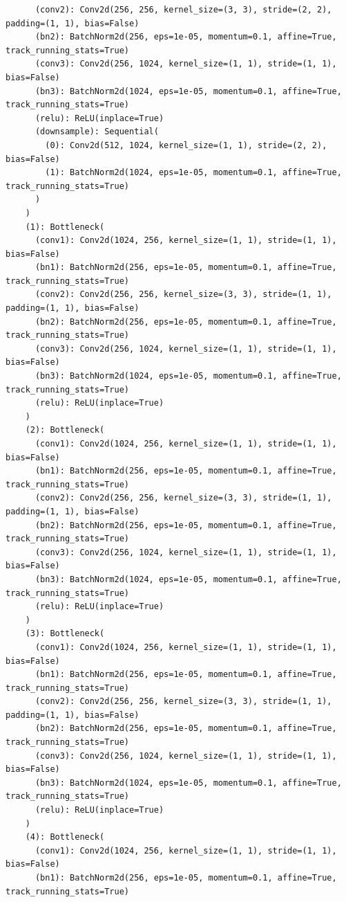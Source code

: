 \documentclass{article}
\begin{document}
\begin{verbatim}
      (conv2): Conv2d(256, 256, kernel_size=(3, 3), stride=(2, 2), padding=(1, 1), bias=False)
      (bn2): BatchNorm2d(256, eps=1e-05, momentum=0.1, affine=True, track_running_stats=True)
      (conv3): Conv2d(256, 1024, kernel_size=(1, 1), stride=(1, 1), bias=False)
      (bn3): BatchNorm2d(1024, eps=1e-05, momentum=0.1, affine=True, track_running_stats=True)
      (relu): ReLU(inplace=True)
      (downsample): Sequential(
        (0): Conv2d(512, 1024, kernel_size=(1, 1), stride=(2, 2), bias=False)
        (1): BatchNorm2d(1024, eps=1e-05, momentum=0.1, affine=True, track_running_stats=True)
      )
    )
    (1): Bottleneck(
      (conv1): Conv2d(1024, 256, kernel_size=(1, 1), stride=(1, 1), bias=False)
      (bn1): BatchNorm2d(256, eps=1e-05, momentum=0.1, affine=True, track_running_stats=True)
      (conv2): Conv2d(256, 256, kernel_size=(3, 3), stride=(1, 1), padding=(1, 1), bias=False)
      (bn2): BatchNorm2d(256, eps=1e-05, momentum=0.1, affine=True, track_running_stats=True)
      (conv3): Conv2d(256, 1024, kernel_size=(1, 1), stride=(1, 1), bias=False)
      (bn3): BatchNorm2d(1024, eps=1e-05, momentum=0.1, affine=True, track_running_stats=True)
      (relu): ReLU(inplace=True)
    )
    (2): Bottleneck(
      (conv1): Conv2d(1024, 256, kernel_size=(1, 1), stride=(1, 1), bias=False)
      (bn1): BatchNorm2d(256, eps=1e-05, momentum=0.1, affine=True, track_running_stats=True)
      (conv2): Conv2d(256, 256, kernel_size=(3, 3), stride=(1, 1), padding=(1, 1), bias=False)
      (bn2): BatchNorm2d(256, eps=1e-05, momentum=0.1, affine=True, track_running_stats=True)
      (conv3): Conv2d(256, 1024, kernel_size=(1, 1), stride=(1, 1), bias=False)
      (bn3): BatchNorm2d(1024, eps=1e-05, momentum=0.1, affine=True, track_running_stats=True)
      (relu): ReLU(inplace=True)
    )
    (3): Bottleneck(
      (conv1): Conv2d(1024, 256, kernel_size=(1, 1), stride=(1, 1), bias=False)
      (bn1): BatchNorm2d(256, eps=1e-05, momentum=0.1, affine=True, track_running_stats=True)
      (conv2): Conv2d(256, 256, kernel_size=(3, 3), stride=(1, 1), padding=(1, 1), bias=False)
      (bn2): BatchNorm2d(256, eps=1e-05, momentum=0.1, affine=True, track_running_stats=True)
      (conv3): Conv2d(256, 1024, kernel_size=(1, 1), stride=(1, 1), bias=False)
      (bn3): BatchNorm2d(1024, eps=1e-05, momentum=0.1, affine=True, track_running_stats=True)
      (relu): ReLU(inplace=True)
    )
    (4): Bottleneck(
      (conv1): Conv2d(1024, 256, kernel_size=(1, 1), stride=(1, 1), bias=False)
      (bn1): BatchNorm2d(256, eps=1e-05, momentum=0.1, affine=True, track_running_stats=True)

\end{verbatim}
\end{document}
